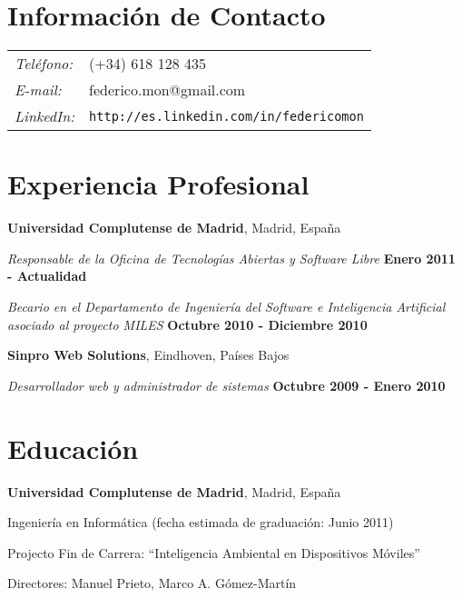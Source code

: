\documentclass[margin,line]{resume}
\begin{document}

\begin{resume}
\section{\sc Información de Contacto}
\vspace{.05in}
\begin{tabular}{@{}p{0.5in}p{2in}}
{\it Teléfono:} &(+34) 618 128 435 \\
{\it E-mail:} &{ federico.mon@gmail.com}\\
{\it LinkedIn:} &{ \tt http://es.linkedin.com/in/federicomon}\\
\end{tabular}

\section{\sc Experiencia Profesional}
{\bf Universidad Complutense de Madrid}, Madrid, España

\vspace{-.3cm}
{\em Responsable de la Oficina de Tecnologías Abiertas y Software Libre} \hfill {\bf Enero 2011 - Actualidad
}

\vspace{-.3cm}
{\em Becario en el Departamento de Ingeniería del Software e Inteligencia Artificial asociado al proyecto MILES} \hfill {\bf Octubre 2010 -
Diciembre 2010}


{\bf Sinpro Web Solutions}, Eindhoven, Países Bajos

\vspace{-.3cm}
{\em Desarrollador web y administrador de sistemas} \hfill {\bf Octubre 2009 -
Enero 2010}

\section{\sc Educación}
{\bf Universidad Complutense de Madrid}, Madrid, España\\
\vspace*{-.1in}
\begin{list1}
\item[] Ingeniería en Informática (fecha estimada
  de graduación: Junio 2011)
\begin{list2}
\vspace*{.05in}
\item Projecto Fin de Carrera:  ``Inteligencia Ambiental en Dispositivos Móviles'' 
\item Directores:  Manuel Prieto, Marco A. Gómez-Martín
\end{list2}
\end{list1}



\end{resume}
\end{document}
